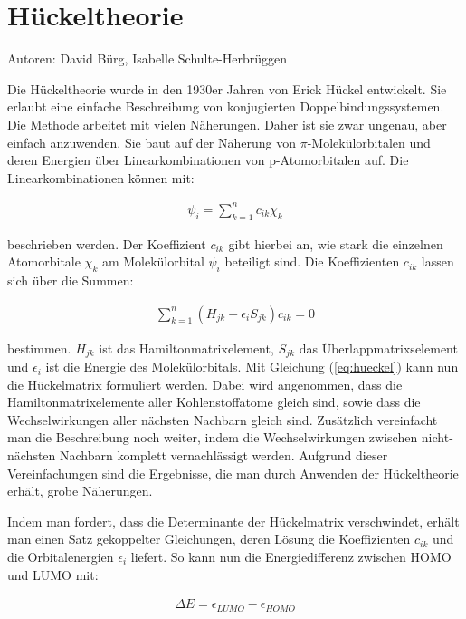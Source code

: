 \section{Hückeltheorie}

Autoren: David Bürg, Isabelle Schulte-Herbrüggen

Die Hückeltheorie wurde in den 1930er Jahren von Erick Hückel entwickelt. \cite{Reinhold} Sie erlaubt eine einfache Beschreibung von konjugierten Doppelbindungssystemen. Die Methode arbeitet mit vielen Näherungen. Daher ist sie zwar ungenau, aber einfach anzuwenden. Sie baut auf der Näherung von $\pi$-Molekülorbitalen und deren Energien über Linearkombinationen von p-Atomorbitalen auf. Die Linearkombinationen können mit:

\begin{align}
 \psi_{i} = \sum \limits_{k=1}^n c_{ik} \chi_k 
\end{align}

beschrieben werden. Der Koeffizient $c_{ik}$ gibt hierbei an, wie  stark die einzelnen Atomorbitale $\chi_k$ am Molekülorbital $\psi_i$ beteiligt sind. Die Koeffizienten $c_{ik}$ lassen sich über die Summen:

\begin{align}\label{eq:hueckel}
  \sum \limits_{k=1}^n (H_{jk}-\epsilon_i S_{jk}) c_{ik} = 0
\end{align}

bestimmen. $H_{jk}$ ist das Hamiltonmatrixelement, $S_{jk}$ das Überlappmatrixselement und $\epsilon_i$ ist die Energie des Molekülorbitals. Mit Gleichung (\ref{eq:hueckel}) kann nun die Hückelmatrix formuliert werden. Dabei wird angenommen, dass die Hamiltonmatrixelemente aller Kohlenstoffatome gleich sind, sowie dass die Wechselwirkungen aller nächsten Nachbarn gleich sind. Zusätzlich vereinfacht man die Beschreibung noch weiter, indem die Wechselwirkungen zwischen nicht-nächsten Nachbarn komplett vernachlässigt werden. Aufgrund dieser Vereinfachungen sind die Ergebnisse, die man durch Anwenden der Hückeltheorie erhält, grobe Näherungen.


Indem man fordert, dass die Determinante der Hückelmatrix verschwindet, erhält man einen Satz gekoppelter Gleichungen, deren Lösung die Koeffizienten $c_{ik}$ und die Orbitalenergien $\epsilon_i$ liefert. So kann nun die Energiedifferenz zwischen HOMO und LUMO mit:

\begin{align}
  \Delta E = \epsilon_{LUMO} - \epsilon_{HOMO}
\end{align}

